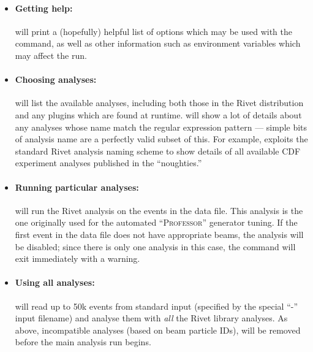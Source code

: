 \documentclass{JHEP3}
\begin{document}
\begin{itemize}

\item \paragraph{Getting help:}{ will print a (hopefully)
    helpful list of options which may be used with the  command, as
    well as other information such as environment variables which may affect the
    run.}

\item \paragraph{Choosing analyses:}{ will list the
    available analyses, including both those in the Rivet distribution and any
    plugins which are found at runtime. 
    will show a lot of details about any analyses whose name match the
     regular expression pattern --- simple bits of analysis name are a
    perfectly valid subset of this. For example,  exploits the standard Rivet analysis naming scheme to show
    details of all available CDF experiment analyses published in the
    ``noughties.''}

\item \paragraph{Running particular analyses:}{ will run the Rivet \cite{Abreu:1996na}
    analysis on the events in the  data file. This analysis is the
    one originally used for the \Delphi automated ``\textsc{Professor}''
    generator tuning.  If the first event in the data file does not have
    appropriate beams, the analysis will be disabled; since there is only one
    analysis in this case, the command will exit immediately with a warning.}

\item \paragraph{Using all analyses:}{ will read up to 
    50k events from standard input (specified by the special ``-'' input filename) 
    and analyse them with \emph{all} the Rivet library analyses. As above, 
    incompatible analyses (based on beam particle IDs), will be removed before 
    the main analysis run begins.}


\end{itemize}
\end{document}
